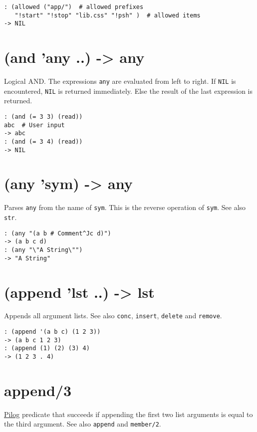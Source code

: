\begin{verbatim}
: (allowed ("app/")  # allowed prefixes
   "!start" "!stop" "lib.css" "!psh" )  # allowed items
-> NIL
\end{verbatim}

 
\section{(and 'any ..) -> any}
\label{sec-8-1-1-17}


Logical AND. The expressions \texttt{any} are evaluated from left to right. If
\texttt{NIL} is encountered, \texttt{NIL} is returned immediately. Else the result of
the last expression is returned.


\begin{verbatim}
: (and (= 3 3) (read))
abc  # User input
-> abc
: (and (= 3 4) (read))
-> NIL
\end{verbatim}

 
\section{(any 'sym) -> any}
\label{sec-8-1-1-18}


Parses \texttt{any} from the name of \texttt{sym}. This is the reverse operation of
\texttt{sym}. See also \texttt{str}.


\begin{verbatim}
: (any "(a b # Comment^Jc d)")
-> (a b c d)
: (any "\"A String\"")
-> "A String"
\end{verbatim}

 
\section{(append 'lst ..) -> lst}
\label{sec-8-1-1-19}


Appends all argument lists. See also \texttt{conc}, \texttt{insert}, \texttt{delete} and
\texttt{remove}.


\begin{verbatim}
: (append '(a b c) (1 2 3))
-> (a b c 1 2 3)
: (append (1) (2) (3) 4)
-> (1 2 3 . 4)
\end{verbatim}

 
\section{append/3}
\label{sec-8-1-1-20}


\hyperref[ref.html-pilog]{Pilog} predicate that succeeds if appending the first
two list arguments is equal to the third argument. See also \texttt{append} and
\texttt{member/2}.


